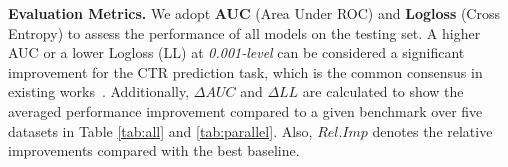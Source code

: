 \documentclass[sigconf]{acmart}
\begin{document}
\begin{table}[t]
\setlength{\belowcaptionskip}{-0.2cm}
 \centering
 \caption{Dataset statistics. K means thousand.}
 \label{Tab.dataset}
\end{table}

\textbf{Evaluation Metrics.}
We adopt \textbf{AUC} (Area Under ROC) and \textbf{Logloss} (Cross Entropy) to assess the performance of all models on the testing set. A higher AUC or a lower Logloss (LL) at \textit{0.001-level} can be considered a significant improvement for the CTR prediction task, which is the common consensus in existing works~\cite{wang2022enhancing, zhu2022nasctr, wang2021dcnm, huang2019fibinet, lian2018xdeepfm}. Additionally, $\Delta{AUC}$ and $\Delta{LL}$ are calculated to show the averaged performance improvement compared to a given benchmark over five datasets in Table \ref{tab:all} and \ref{tab:parallel}. Also, $\textit{Rel.Imp}$ denotes the relative improvements compared with the best baseline. 
\end{document}
